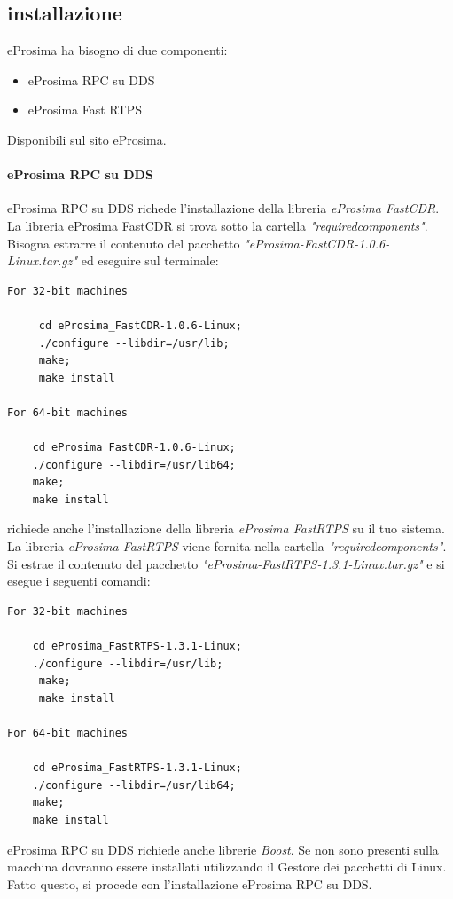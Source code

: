 \documentclass[a4paper]{article}
\begin{document}
\subsection{installazione}
eProsima ha bisogno di due componenti:
\begin{itemize}
\item eProsima RPC su DDS
\item eProsima Fast RTPS
\end{itemize}

Disponibili sul sito \href{https://www.eprosima.com/}{eProsima}.
\paragraph{eProsima RPC su DDS}
eProsima RPC su DDS richede l'installazione della libreria \textit{eProsima FastCDR}. La libreria eProsima FastCDR si trova sotto la cartella
\textit{"requiredcomponents"}. Bisogna estrarre il contenuto del pacchetto \textit{"eProsima-FastCDR-1.0.6-Linux.tar.gz"}
ed eseguire sul terminale:
\begin{verbatim}
For 32-bit machines

     cd eProsima_FastCDR-1.0.6-Linux;
     ./configure --libdir=/usr/lib;
     make; 
     make install
     
For 64-bit machines

    cd eProsima_FastCDR-1.0.6-Linux; 
    ./configure --libdir=/usr/lib64;
    make;
    make install
\end{verbatim}
richiede anche l'installazione della libreria \textit{eProsima FastRTPS} su
il tuo sistema. La libreria \textit{eProsima FastRTPS} viene fornita nella cartella
\textit{"requiredcomponents"}. Si estrae il contenuto del pacchetto
\textit{"eProsima-FastRTPS-1.3.1-Linux.tar.gz"} e si esegue i seguenti comandi:

\begin{verbatim}
For 32-bit machines

    cd eProsima_FastRTPS-1.3.1-Linux; 
    ./configure --libdir=/usr/lib;
     make; 
     make install

For 64-bit machines

    cd eProsima_FastRTPS-1.3.1-Linux;
    ./configure --libdir=/usr/lib64;
    make;
    make install

\end{verbatim}

eProsima RPC su DDS richiede anche librerie \textit{Boost}. Se non sono presenti sulla macchina dovranno essere installati utilizzando il  Gestore dei pacchetti di Linux. Fatto questo, si procede con l'installazione  eProsima RPC su DDS.
\end{document}
